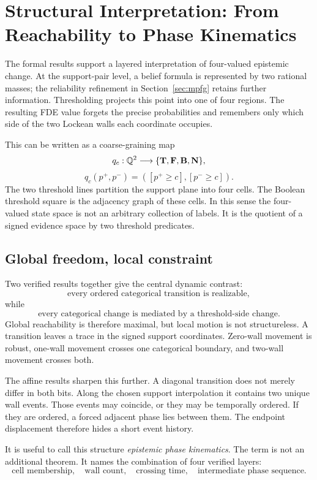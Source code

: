 \section{Structural Interpretation: From Reachability to Phase Kinematics}
\label{sec:interpretation}

\statusinterpretive

The formal results support a layered interpretation of four-valued epistemic change. At the support-pair level, a belief formula is represented by two rational masses; the reliability refinement in Section~\ref{sec:mpfg} retains further information. Thresholding projects this point into one of four regions. The resulting FDE value forgets the precise probabilities and remembers only which side of the two Lockean walls each coordinate occupies.

This can be written as a coarse-graining map
\[
  q_c:\mathbb{Q}^2\longrightarrow\{\mathbf{T},\mathbf{F},\mathbf{B},\mathbf{N}\},
\]
\[
  q_c(p^+,p^-)
  =([p^+\ge c],[p^-\ge c]).
\]
The two threshold lines partition the support plane into four cells. The Boolean threshold square is the adjacency graph of these cells. In this sense the four-valued state space is not an arbitrary collection of labels. It is the quotient of a signed evidence space by two threshold predicates.

\subsection{Global freedom, local constraint}

Two verified results together give the central dynamic contrast:
\[
  \text{every ordered categorical transition is realizable},
\]
while
\[
  \text{every categorical change is mediated by a threshold-side change}.
\]
Global reachability is therefore maximal, but local motion is not structureless. A transition leaves a trace in the signed support coordinates. Zero-wall movement is robust, one-wall movement crosses one categorical boundary, and two-wall movement crosses both.

The affine results sharpen this further. A diagonal transition does not merely differ in both bits. Along the chosen support interpolation it contains two unique wall events. Those events may coincide, or they may be temporally ordered. If they are ordered, a forced adjacent phase lies between them. The endpoint displacement therefore hides a short event history.

It is useful to call this structure \emph{epistemic phase kinematics}. The term is not an additional theorem. It names the combination of four verified layers:
\[
  \text{cell membership},
  \quad
  \text{wall count},
  \quad
  \text{crossing time},
  \quad
  \text{intermediate phase sequence}.
\]

